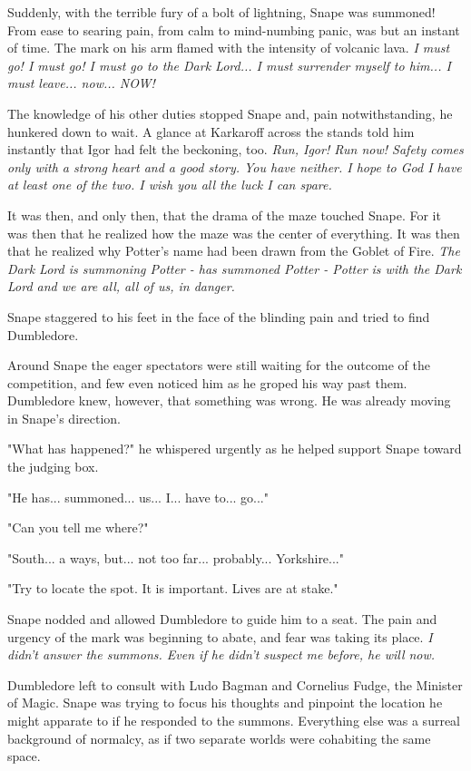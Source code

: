 \documentclass[a4paper,11pt]{article}
\begin{document}
Suddenly, with the terrible fury of a bolt of lightning, Snape was summoned! From ease to searing pain, from calm to mind-numbing panic, was but an instant of time. The mark on his arm flamed with the intensity of volcanic lava. \emph{I must go! I must go! I must go to the Dark Lord... I must surrender myself to him... I must leave... now... NOW!}

The knowledge of his other duties stopped Snape and, pain notwithstanding, he hunkered down to wait. A glance at Karkaroff across the stands told him instantly that Igor had felt the beckoning, too. \emph{Run, Igor! Run now! Safety comes only with a strong heart and a good story. You have neither. I hope to God I have at least one of the two. I wish you all the luck I can spare.}

It was then, and only then, that the drama of the maze touched Snape. For it was then that he realized how the maze was the center of everything. It was then that he realized why Potter's name had been drawn from the Goblet of Fire. \emph{The Dark Lord is summoning Potter - has summoned Potter - Potter is with the Dark Lord and we are all, all of us, in danger.}

Snape staggered to his feet in the face of the blinding pain and tried to find Dumbledore.

Around Snape the eager spectators were still waiting for the outcome of the competition, and few even noticed him as he groped his way past them. Dumbledore knew, however, that something was wrong. He was already moving in Snape's direction.

"What has happened?" he whispered urgently as he helped support Snape toward the judging box.

"He has... summoned... us... I... have to... go..."

"Can you tell me where?"

"South... a ways, but... not too far... probably... Yorkshire..."

"Try to locate the spot. It is important. Lives are at stake."

Snape nodded and allowed Dumbledore to guide him to a seat. The pain and urgency of the mark was beginning to abate, and fear was taking its place. \emph{I didn't answer the summons. Even if he didn't suspect me before, he will now.}

Dumbledore left to consult with Ludo Bagman and Cornelius Fudge, the Minister of Magic. Snape was trying to focus his thoughts and pinpoint the location he might apparate to if he responded to the summons. Everything else was a surreal background of normalcy, as if two separate worlds were cohabiting the same space.
\end{document}
